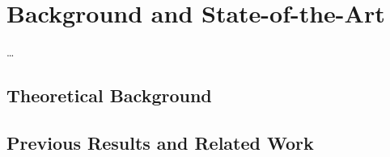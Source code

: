 \chapter{Background and State-of-the-Art}
\label{chap.stateoftheart}
\dots


\section{Theoretical Background}
%

\section{Previous Results and Related Work}
%